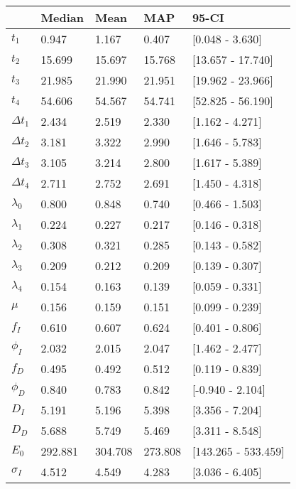 \begin{tabular}{lllll}
\toprule
{} &   Median &     Mean &      MAP &                95-CI \\
\midrule
$t_1$        &    0.947 &    1.167 &    0.407 &      [0.048 - 3.630] \\
$t_2$        &   15.699 &   15.697 &   15.768 &    [13.657 - 17.740] \\
$t_3$        &   21.985 &   21.990 &   21.951 &    [19.962 - 23.966] \\
$t_4$        &   54.606 &   54.567 &   54.741 &    [52.825 - 56.190] \\
$\Delta t_1$ &    2.434 &    2.519 &    2.330 &      [1.162 - 4.271] \\
$\Delta t_2$ &    3.181 &    3.322 &    2.990 &      [1.646 - 5.783] \\
$\Delta t_3$ &    3.105 &    3.214 &    2.800 &      [1.617 - 5.389] \\
$\Delta t_4$ &    2.711 &    2.752 &    2.691 &      [1.450 - 4.318] \\
$\lambda_0$  &    0.800 &    0.848 &    0.740 &      [0.466 - 1.503] \\
$\lambda_1$  &    0.224 &    0.227 &    0.217 &      [0.146 - 0.318] \\
$\lambda_2$  &    0.308 &    0.321 &    0.285 &      [0.143 - 0.582] \\
$\lambda_3$  &    0.209 &    0.212 &    0.209 &      [0.139 - 0.307] \\
$\lambda_4$  &    0.154 &    0.163 &    0.139 &      [0.059 - 0.331] \\
$\mu$        &    0.156 &    0.159 &    0.151 &      [0.099 - 0.239] \\
$f_I$        &    0.610 &    0.607 &    0.624 &      [0.401 - 0.806] \\
$\phi_I$     &    2.032 &    2.015 &    2.047 &      [1.462 - 2.477] \\
$f_D$        &    0.495 &    0.492 &    0.512 &      [0.119 - 0.839] \\
$\phi_D$     &    0.840 &    0.783 &    0.842 &     [-0.940 - 2.104] \\
$D_I$        &    5.191 &    5.196 &    5.398 &      [3.356 - 7.204] \\
$D_D$        &    5.688 &    5.749 &    5.469 &      [3.311 - 8.548] \\
$E_0$        &  292.881 &  304.708 &  273.808 &  [143.265 - 533.459] \\
$\sigma_I$   &    4.512 &    4.549 &    4.283 &      [3.036 - 6.405] \\

\end{tabular}
